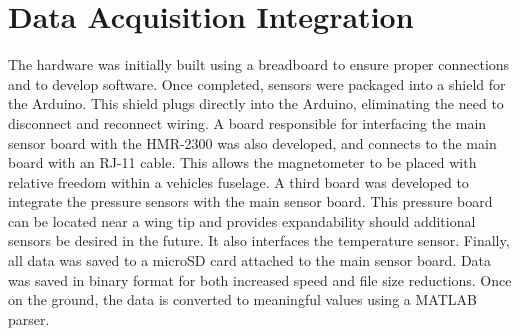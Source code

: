 \section{Data Acquisition Integration}
The hardware was initially built using a breadboard to ensure proper connections and to develop software. Once completed, sensors were packaged into a shield for the Arduino. This shield plugs directly into the Arduino, eliminating the need to disconnect and reconnect wiring. A board responsible for interfacing the main sensor board with the HMR-2300 was also developed, and connects to the main board with an RJ-11 cable. This allows the magnetometer to be placed with relative freedom within a vehicles fuselage. A third board was developed to integrate the pressure sensors with the main sensor board. This pressure board can be located near a wing tip and  provides expandability should additional sensors be desired in the future. It also interfaces the temperature sensor. Finally, all data was saved to a microSD card attached to the main sensor board. Data was saved in binary format for both increased speed and file size reductions. Once on the ground, the data is converted to meaningful values using a MATLAB parser.
